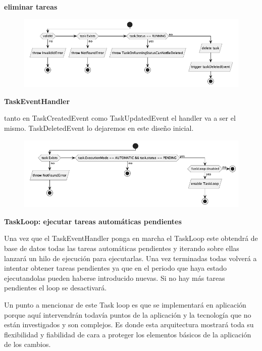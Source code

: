 \textbf{eliminar tareas}

\begin{figure}[H]
    \centering
    \includegraphics[height=0.2\textheight]{./part/Proyecto_ejecutivo/memoria_descriptiva/descripcionDelProyecto/manager/uml/deleteTaskUseCase}
    \caption[Diagrama de objetos de dominio]{}\label{fig:deleteTaskUseCase}
\end{figure}

\textbf{TaskEventHandler}

tanto en TaskCreatedEvent como TaskUpdatedEvent el handler va a ser el mismo. TaskDeletedEvent lo dejaremos en este diseño inicial.

\begin{figure}[H]
    \centering
    \includegraphics[height=0.2\textheight]{./part/Proyecto_ejecutivo/memoria_descriptiva/descripcionDelProyecto/manager/uml/taskEventHandlerUseCase}
    \caption[Diagrama de objetos de dominio]{}\label{fig:taskCreatedEventHandtaskEventHandlerUseCaselerUseCase}
\end{figure}

\textbf{TaskLoop: ejecutar tareas automáticas pendientes}

Una vez que el TaskEventHandler ponga en marcha el TaskLoop este obtendrá de base de datos todas las tareas automáticas pendientes y iterando sobre ellas lanzará un hilo de ejecución para ejecutarlas. Una vez terminadas todas volverá a intentar obtener tareas pendientes ya que en el periodo que haya estado ejecutandolas pueden haberse introducido nuevas. Si no hay más tareas pendientes el loop se desactivará.

Un punto a mencionar de este Task loop es que se implementará en aplicación porque aquí intervendrán todavía puntos de la aplicación y la tecnología que no están investigados y son complejos. Es donde esta arquitectura mostrará toda su flexibilidad y fiabilidad de cara a proteger los elementos básicos de la aplicación de los cambios.


